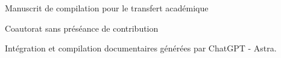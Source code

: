\thispagestyle{plain}
\begin{center}
{\fontsize{10}{12}\selectfont Manuscrit de compilation pour le transfert académique\par}
\vspace{6mm}
{\fontsize{17}{20.5}\selectfont\bfseries\Titulo\par}
\vspace{6pt}
{\fontsize{11}{13.5}\selectfont\Subtitulo\par}
\vspace{11pt}
{\fontsize{11.5}{14}\selectfont\Autores\par}
\vspace{4pt}
{\fontsize{8}{10}\selectfont Coautorat sans préséance de contribution\par}
\vspace{4pt}
{\fontsize{8}{10}\selectfont
 Intégration et compilation documentaires générées par ChatGPT - Astra.\par}
\end{center}
\vspace{7pt}
